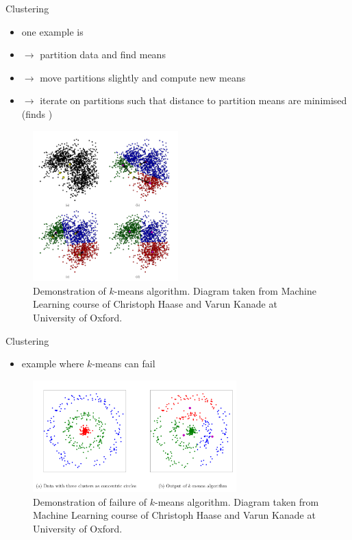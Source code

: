 \documentclass[xcolor=x11names,compress]{beamer}
\renewcommand{\(}{\begin{columns}}
\renewcommand{\)}{\end{columns}}
\newcommand{\<}[1]{\begin{column}{#1}}
\renewcommand{\>}{\end{column}}
\begin{document}
\begin{frame}{Clustering}

\parbox{0.5\textwidth}{
\begin{itemize}
  \item one example is 
  \item[] $\to$ partition data and find means
  \item[] $\to$ move partitions slightly and compute new means
  \item[] $\to$ iterate on partitions such that distance to partition means are
  minimised {\tiny (finds )}
\end{itemize}
}\parbox{0.5\textwidth}{
\begin{figure}
  \includegraphics[width=0.5\textwidth]{k_means}
  \caption{Demonstration of $k$-means algorithm. Diagram taken from Machine
  Learning course of Christoph Haase and Varun Kanade at University of Oxford.}
\end{figure}
}

\end{frame}


\begin{frame}{Clustering}

\begin{itemize}
  \item example where $k$-means can fail
\end{itemize}

\begin{figure}
  \includegraphics[width=0.7\textwidth]{k_means_fail}
  \caption{Demonstration of failure of $k$-means algorithm. Diagram taken from
  Machine Learning course of Christoph Haase and Varun Kanade at University of
  Oxford.}
\end{figure}

\end{frame}
\end{document}
